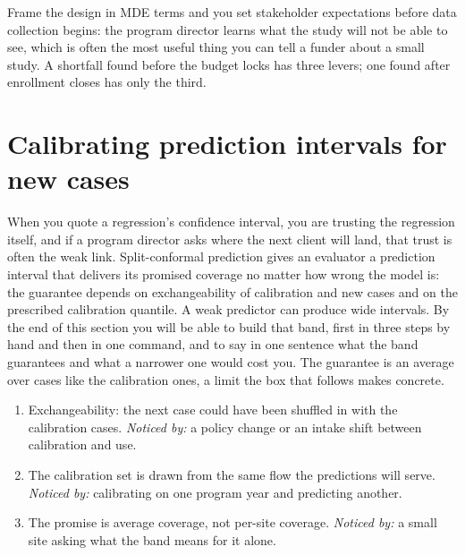 \documentclass[
    a4paper,
    fontsize=10pt,
    twoside=true,
    numbers=noenddot,
]{kaobook}
\newenvironment{restson}[1][What this depends on]{%
    \begin{restsonbox}[frametitle={#1}]%
}{%
    \end{restsonbox}%
}
\begin{document}
Frame the design in MDE terms and you set stakeholder expectations before data collection begins: the program director learns what the study will not be able to see, which is often the most useful thing you can tell a funder about a small study. A shortfall found before the budget locks has three levers; one found after enrollment closes has only the third.

\section{Calibrating prediction intervals for new cases}\label{sec:conformal}
When you quote a regression's confidence interval, you are trusting the regression itself, and if a program director asks where the next client will land, that trust is often the weak link. Split-conformal prediction gives an evaluator a prediction interval that delivers its promised coverage no matter how wrong the model is: the guarantee depends on exchangeability of calibration and new cases and on the prescribed calibration quantile. A weak predictor can produce wide intervals. By the end of this section you will be able to build that band, first in three steps by hand and then in one command, and to say in one sentence what the band guarantees and what a narrower one would cost you. The guarantee is an average over cases like the calibration ones, a limit the box that follows makes concrete.

\begin{restson}[What the conformal guarantee depends on]
\begin{enumerate}
\item Exchangeability: the next case could have been shuffled in with the calibration cases. \emph{Noticed by:} a policy change or an intake shift between calibration and use.
\item The calibration set is drawn from the same flow the predictions will serve. \emph{Noticed by:} calibrating on one program year and predicting another.
\item The promise is average coverage, not per-site coverage. \emph{Noticed by:} a small site asking what the band means for it alone.
\end{enumerate}
\end{restson}
\end{document}
